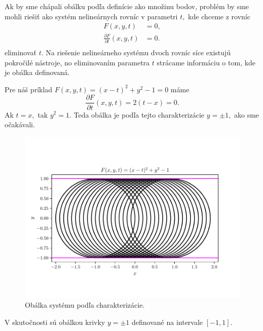 Ak by sme chápali obálku podľa definície ako množinu bodov, problém by sme mohli riešiť ako systém nelineárnych rovníc v parametri $t,$ kde chceme z rovníc 
\begin{align*}
F(x,y,t) &= 0, \\
\frac{\partial F}{\partial t}(x, y, t) &= 0. \\
\end{align*}
eliminovať $t.$ Na riešenie nelineárneho systému dvoch rovníc síce existujú pokročilé nástroje, no eliminovaním parametra $t$ strácame informáciu o tom, kde je obálka definovaná. 

\begin{example}
Pre náš príklad $ F(x, y, t) = (x - t)^2 + y^2 - 1 = 0 $ máme 
$$\frac{\partial F}{\partial t}(x, y, t) = 2(t-x) = 0. $$
Ak $t = x, $ tak $y^2 = 1.$ Teda obálka je podľa tejto charakterizácie $ y = \pm 1, $ ako sme očakávali.
\end{example}

\begin{figure}[H]
	\centering
	\includegraphics{images/system_with_envelope_unlimited_domain.pdf}
	\caption{Obálka systému podľa charakterizácie.}
	\label{fig:system_with_envelope_unlimited_domain}
\end{figure}

V skutočnosti sú obálkou krivky $y=\pm 1$ definované na intervale $[-1,1]$.

